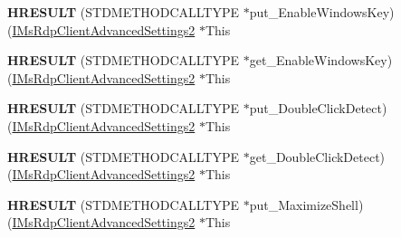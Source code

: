 \begin{DoxyCompactItemize}
\item 
\mbox{\label{struct_m_s_t_s_c_lib_1_1_i_ms_rdp_client_advanced_settings2_vtbl_afcfc141f804ee83def6bc7332bb2506d}} 
{\bfseries H\+R\+E\+S\+U\+LT} (S\+T\+D\+M\+E\+T\+H\+O\+D\+C\+A\+L\+L\+T\+Y\+PE $\ast$put\+\_\+\+Enable\+Windows\+Key)(\hyperlink{interface_m_s_t_s_c_lib_1_1_i_ms_rdp_client_advanced_settings2}{I\+Ms\+Rdp\+Client\+Advanced\+Settings2} $\ast$This
\item 
\mbox{\label{struct_m_s_t_s_c_lib_1_1_i_ms_rdp_client_advanced_settings2_vtbl_a351879f9fbaa57b17e73b9d4aa551e89}} 
{\bfseries H\+R\+E\+S\+U\+LT} (S\+T\+D\+M\+E\+T\+H\+O\+D\+C\+A\+L\+L\+T\+Y\+PE $\ast$get\+\_\+\+Enable\+Windows\+Key)(\hyperlink{interface_m_s_t_s_c_lib_1_1_i_ms_rdp_client_advanced_settings2}{I\+Ms\+Rdp\+Client\+Advanced\+Settings2} $\ast$This
\item 
\mbox{\label{struct_m_s_t_s_c_lib_1_1_i_ms_rdp_client_advanced_settings2_vtbl_a6bd17f5637498789dfb1785db3e346e4}} 
{\bfseries H\+R\+E\+S\+U\+LT} (S\+T\+D\+M\+E\+T\+H\+O\+D\+C\+A\+L\+L\+T\+Y\+PE $\ast$put\+\_\+\+Double\+Click\+Detect)(\hyperlink{interface_m_s_t_s_c_lib_1_1_i_ms_rdp_client_advanced_settings2}{I\+Ms\+Rdp\+Client\+Advanced\+Settings2} $\ast$This
\item 
\mbox{\label{struct_m_s_t_s_c_lib_1_1_i_ms_rdp_client_advanced_settings2_vtbl_a27cd4a865015b6857d7ba2aa175b211b}} 
{\bfseries H\+R\+E\+S\+U\+LT} (S\+T\+D\+M\+E\+T\+H\+O\+D\+C\+A\+L\+L\+T\+Y\+PE $\ast$get\+\_\+\+Double\+Click\+Detect)(\hyperlink{interface_m_s_t_s_c_lib_1_1_i_ms_rdp_client_advanced_settings2}{I\+Ms\+Rdp\+Client\+Advanced\+Settings2} $\ast$This
\item 
\mbox{\label{struct_m_s_t_s_c_lib_1_1_i_ms_rdp_client_advanced_settings2_vtbl_a73d47185ace9cbcf1472160a7bfc4310}} 
{\bfseries H\+R\+E\+S\+U\+LT} (S\+T\+D\+M\+E\+T\+H\+O\+D\+C\+A\+L\+L\+T\+Y\+PE $\ast$put\+\_\+\+Maximize\+Shell)(\hyperlink{interface_m_s_t_s_c_lib_1_1_i_ms_rdp_client_advanced_settings2}{I\+Ms\+Rdp\+Client\+Advanced\+Settings2} $\ast$This
\item 

\end{DoxyCompactItemize}
